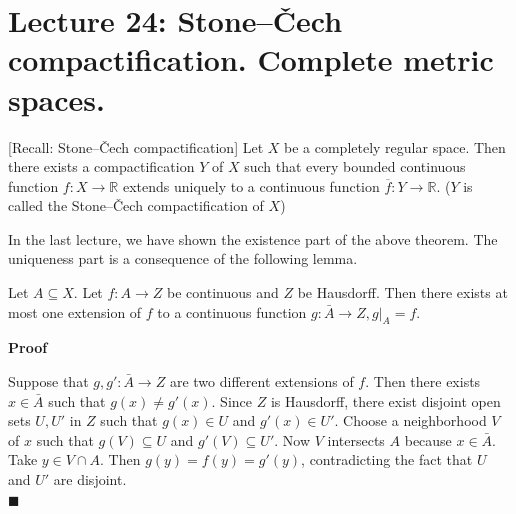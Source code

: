 \documentclass[main.tex]{subfiles}
\begin{document}
\pagestyle{plain}
\setcounter{chapter}{23}

\chapter{Lecture 24: Stone–Čech compactification. Complete metric spaces. }
\label{chap:chapter24}

\begin{theorem}\label{thm:SC}
    [Recall: Stone–Čech compactification]
    Let $X$ be a completely regular space. Then there exists a compactification $Y$ of $X$ such that every bounded continuous function $f: X \rightarrow \mathbb{R}$ extends uniquely to a continuous function $\overline{f}: Y \rightarrow \mathbb{R}$. ($Y$ is called the Stone–Čech compactification of $X$) 
\end{theorem}

\par In the last lecture, we have shown the existence part of the above theorem. The uniqueness part is a consequence of the following lemma. 

\begin{lemma}
    \label{lemma:extenUnique}
    Let $A \subseteq X$. Let $f: A \rightarrow Z $ be continuous and $Z$ be Hausdorff. Then there exists at most one extension of $f$ to a continuous function $g: \bar{A} \rightarrow Z, g|_{A} = f$. 
\end{lemma}
\par \noindent \textbf{Proof} 
\par Suppose that $g, g': \bar{A} \rightarrow Z$ are two different extensions of $f$. Then there exists $x \in \bar{A}$ such that $g(x) \neq g'(x)$. Since $Z$ is Hausdorff, there exist disjoint open sets $U, U'$ in $Z$ such that $g(x) \in U$ and $g'(x) \in U'$. 
Choose a neighborhood $V$ of $x$ such that $g(V) \subseteq U$ and $g'(V) \subseteq U'$. Now $V$ intersects $A$ because $x \in \bar{A}$. Take $y \in V \cap A$. Then $g(y) = f(y) = g'(y)$, contradicting the fact that $U$ and $U'$ are disjoint. 
\mbox{} \\ \null \hfill $\blacksquare$ 
\end{document}
